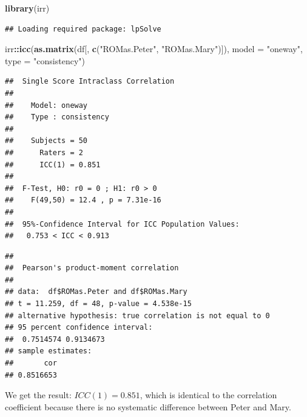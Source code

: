 \documentclass[
]{article}
\newenvironment{Shaded}{\begin{snugshade}}{\end{snugshade}}
\newcommand{\AttributeTok}[1]{\textcolor[rgb]{0.13,0.29,0.53}{#1}}
\newcommand{\FunctionTok}[1]{\textcolor[rgb]{0.13,0.29,0.53}{\textbf{#1}}}
\newcommand{\NormalTok}[1]{#1}
\newcommand{\SpecialCharTok}[1]{\textcolor[rgb]{0.81,0.36,0.00}{\textbf{#1}}}
\newcommand{\StringTok}[1]{\textcolor[rgb]{0.31,0.60,0.02}{#1}}
\begin{document}
\begin{Shaded}
\begin{Highlighting}[]
\FunctionTok{library}\NormalTok{(irr)}
\end{Highlighting}
\end{Shaded}

\begin{verbatim}
## Loading required package: lpSolve
\end{verbatim}

\begin{Shaded}
\begin{Highlighting}[]
\NormalTok{irr}\SpecialCharTok{::}\FunctionTok{icc}\NormalTok{(}\FunctionTok{as.matrix}\NormalTok{(df[, }\FunctionTok{c}\NormalTok{(}\StringTok{"ROMas.Peter"}\NormalTok{, }\StringTok{"ROMas.Mary"}\NormalTok{)]), }
    \AttributeTok{model =} \StringTok{"oneway"}\NormalTok{, }\AttributeTok{type =} \StringTok{"consistency"}\NormalTok{)}
\end{Highlighting}
\end{Shaded}

\begin{verbatim}
##  Single Score Intraclass Correlation
## 
##    Model: oneway 
##    Type : consistency 
## 
##    Subjects = 50 
##      Raters = 2 
##      ICC(1) = 0.851
## 
##  F-Test, H0: r0 = 0 ; H1: r0 > 0 
##    F(49,50) = 12.4 , p = 7.31e-16 
## 
##  95%-Confidence Interval for ICC Population Values:
##   0.753 < ICC < 0.913
\end{verbatim}

\begin{Shaded}
\end{Shaded}

\begin{verbatim}
## 
##  Pearson's product-moment correlation
## 
## data:  df$ROMas.Peter and df$ROMas.Mary
## t = 11.259, df = 48, p-value = 4.538e-15
## alternative hypothesis: true correlation is not equal to 0
## 95 percent confidence interval:
##  0.7514574 0.9134673
## sample estimates:
##       cor 
## 0.8516653
\end{verbatim}

We get the result: \(ICC(1) = 0.851\), which is identical to the correlation coefficient
because there is no systematic difference between Peter and Mary.
\end{document}
